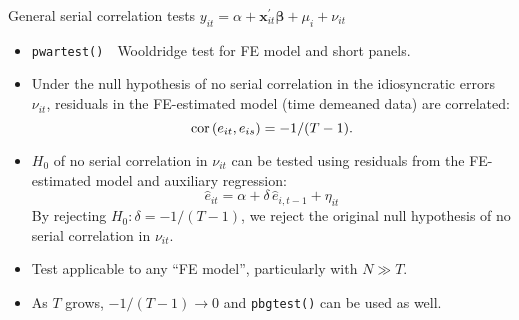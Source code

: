 \documentclass{beamer}
\begin{document}
\begin{frame}{General serial correlation tests}
$y_{it} = \alpha + \bm{x}^{\prime}_{it} \bm{\beta} + \mu_i + \nu_{it}$\\ \medskip
\begin{itemize}
    \item \texttt{pwartest()}~~Wooldridge test for FE model and short panels.\\
    \smallskip
    \item Under the null hypothesis of no serial correlation in the idiosyncratic errors $\nu_{it}$, residuals in the FE-estimated model (time demeaned data) are correlated: $$\textnormal{cor}\left(e_{it},e_{is}\right)=-1/(T-1).$$
    \item $H_0$ of no serial correlation in $\nu_{it}$ can be tested using residuals from the FE-estimated model and auxiliary regression:
    $$ \hat{e}_{it} = \alpha + \delta \, \hat{e}_{i,t-1} + \eta_{it}$$
    By rejecting $H_0: \delta = -1/(T-1)$, we reject the original null hypothesis of no serial correlation in  $\nu_{it}$.
    \smallskip
    \item Test applicable to any ``FE model'', particularly with $N \gg T$.
    \smallskip
    \item As $T$ grows, $-1/(T-1) \rightarrow 0$ and \texttt{pbgtest()} can be used as well.
\end{itemize}
\end{frame}
\end{document}
